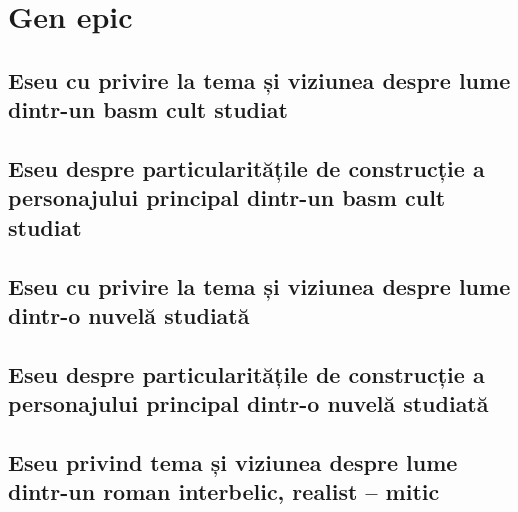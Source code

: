 


\CustomToC                %


\part{Gen epic}


\chapter{Eseu cu privire la tema și viziunea despre lume dintr-un basm cult studiat}


\chapter{Eseu despre particularitățile de construcție a personajului principal dintr-un basm cult studiat}



\chapter{Eseu cu privire la tema și viziunea despre lume dintr-o nuvelă studiată}


\chapter{Eseu despre particularitățile de construcție a personajului principal dintr-o nuvelă studiată}



\chapter{Eseu privind tema și viziunea despre lume dintr-un roman interbelic, realist -- mitic}



